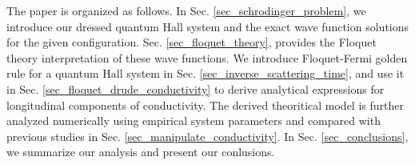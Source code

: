 The paper is organized as follows. In Sec.  \ref{sec_schrodinger_problem}, we introduce our dressed quantum Hall system and the exact wave function solutions for the given configuration. Sec. \ref{sec_floquet_theory}, provides the Floquet theory interpretation of these wave functions.
We introduce Floquet-Fermi golden rule for a quantum Hall system in Sec. \ref{sec_inverse_scattering_time}, and use it in Sec. \ref{sec_floquet_drude_conductivity} to derive analytical expressions for longitudinal components of conductivity.
The derived theoritical model is further analyzed numerically using empirical system parameters and compared with previous studies in Sec. \ref{sec_manipulate_conductivity}.
In Sec. \ref{sec_conclusions}, we summarize our analysis and present our conlusions.
